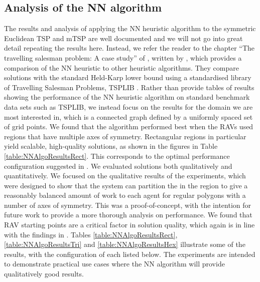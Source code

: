 


\subsection{Analysis of the NN algorithm}


The results and analysis of applying the NN heuristic algorithm to the symmetric Euclidean TSP and mTSP are well documented and we will not go into great detail repeating the results here. Instead, we refer the reader to the chapter ``The travelling salesman problem: A case study'' of \cite{Aarts:1997:LSC:549160}, written by \citeauthor{Johnson1997TheOptimization}, which provides a comparison of the NN heuristic to other heuristic algorithms. They compare solutions with the standard Held-Karp lower bound \cite{Held1962AProblems} using a standardised library of Travelling Salesman Problems, TSPLIB \cite{TSPLIB}. Rather than provide tables of results showing the performance of the NN heuristic algorithm on standard benchmark data sets such as TSPLIB, we instead focus on the results for the domain we are most interested in, which is a connected graph defined by a uniformly spaced set of grid points. We found that the algorithm performed best when the RAVs used regions that have multiple axes of symmetry. Rectangular regions in particular yield scalable, high-quality solutions, as shown in the figures in Table \ref{table:NNAlgoResultsRect}. This corresponds to the optimal performance configuration suggested in \cite{Hungerlander2018TheGrids}. We evaluated solutions both qualitatively and  quantitatively. We focused on the qualitative results of the experiments, which were designed to show that the system can partition the in the region to give a reasonably balanced amount of work to each agent for regular polygons with a number of axes of symmetry. This was a proof-of-concept, with the intention for future work to provide a more thorough analysis on performance. We found that RAV starting points are a critical factor in solution quality, which again is in line with the findings in \cite{Hungerlander2018TheGrids}. Tables \ref{table:NNAlgoResultsRect}, \ref{table:NNAlgoResultsTri} and \ref{table:NNAlgoResultsHex} %
illustrate some of the results, with the configuration of each listed below. The experiments are intended to demonstrate practical use cases where the NN algorithm will provide qualitatively good results.

